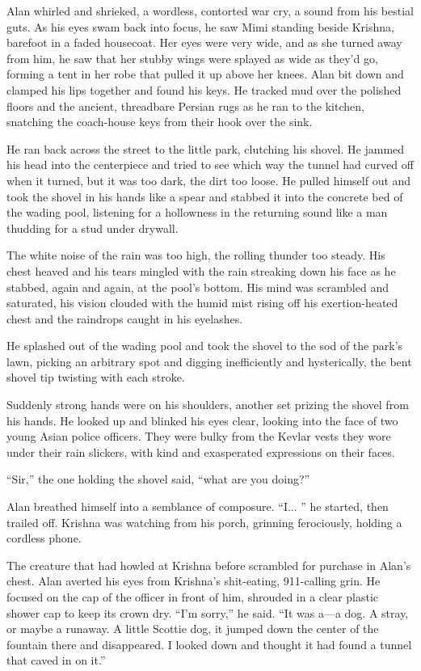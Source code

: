 \documentclass{article}
\begin{document}
Alan whirled and shrieked, a wordless, contorted war cry, a sound from
his bestial guts.  As his eyes swam back into focus, he saw Mimi
standing beside Krishna, barefoot in a faded housecoat.  Her eyes were
very wide, and as she turned away from him, he saw that her stubby
wings were splayed as wide as they'd go, forming a tent in her robe
that pulled it up above her knees.  Alan bit down and clamped his lips
together and found his keys.  He tracked mud over the polished floors
and the ancient, threadbare Persian rugs as he ran to the kitchen,
snatching the coach-house keys from their hook over the sink.

He ran back across the street to the little park, clutching his
shovel.  He jammed his head into the centerpiece and tried to see
which way the tunnel had curved off when it turned, but it was too
dark, the dirt too loose.  He pulled himself out and took the shovel
in his hands like a spear and stabbed it into the concrete bed of the
wading pool, listening for a hollowness in the returning sound like a
man thudding for a stud under drywall.

The white noise of the rain was too high, the rolling thunder too
steady.  His chest heaved and his tears mingled with the rain
streaking down his face as he stabbed, again and again, at the pool's
bottom.  His mind was scrambled and saturated, his vision clouded with
the humid mist rising off his exertion-heated chest and the raindrops
caught in his eyelashes.

He splashed out of the wading pool and took the shovel to the sod of
the park's lawn, picking an arbitrary spot and digging inefficiently
and hysterically, the bent shovel tip twisting with each stroke.

Suddenly strong hands were on his shoulders, another set prizing the
shovel from his hands.  He looked up and blinked his eyes clear,
looking into the face of two young Asian police officers.  They were
bulky from the Kevlar vests they wore under their rain slickers, with
kind and exasperated expressions on their faces.

``Sir,'' the one holding the shovel said, ``what are you doing?''

Alan breathed himself into a semblance of composure.  ``I...  '' he
started, then trailed off.  Krishna was watching from his porch,
grinning ferociously, holding a cordless phone.

The creature that had howled at Krishna before scrambled for purchase
in Alan's chest.  Alan averted his eyes from Krishna's shit-eating,
911-calling grin.  He focused on the cap of the officer in front of
him, shrouded in a clear plastic shower cap to keep its crown dry. 
``I'm sorry,'' he said.  ``It was a---a dog.  A stray, or maybe a
runaway.  A little Scottie dog, it jumped down the center of the
fountain there and disappeared.  I looked down and thought it had
found a tunnel that caved in on it.''
\end{document}
